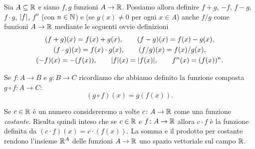 \begin{definition}
Sia $A \subseteq \mathbb R$ e siano $f,g$ funzioni $A \to \mathbb R$.
Possiamo allora definire
$f+g$, $-f$, $f-g$, $f\cdot g$, ${\left|f\right|}$, $f^n$ (con $n\in \mathbb N$)
e (se $g(x)\neq 0$ per ogni $x\in A$) anche $f/g$
come funzioni $A \to \mathbb R$ mediante le seguenti ovvie
definizioni
\begin{gather*}
(f+g)(x) = f(x) + g(x), \qquad
(f-g)(x) = f(x) - g(x), \\
(f\cdot g)(x) = f(x) \cdot g(x), \qquad
(f/g)(x) = f(x) / g(x), \\
(-f)(x) = -(f(x)), \qquad
{\left|f\right|}(x) = {\left|f(x)\right|}, \qquad
f^n(x) = (f(x))^n.
\end{gather*}

Se $f\colon A \to B$ e $g\colon B\to C$ ricordiamo
che abbiamo definito la funzione composta
$g\circ f\colon A \to C$:
\[
  (g\circ f)(x) = g(f(x)).
\]

Se $c\in \mathbb R$ è un numero considereremo a volte $c\colon A \to \mathbb R$
come una funzione \emph{costante}.
Risulta quindi inteso che se $c\in \mathbb R$ e $f\colon A \to \mathbb R$
allora $c\cdot f$ è la funzione definita da
$(c\cdot f)(x) = c\cdot (f(x))$.
La somma e il prodotto per costante rendono l'insieme $\mathbb R^A$
delle funzioni $A \to \mathbb R$ uno spazio vettoriale sul campo $\mathbb R$.
\end{definition}

